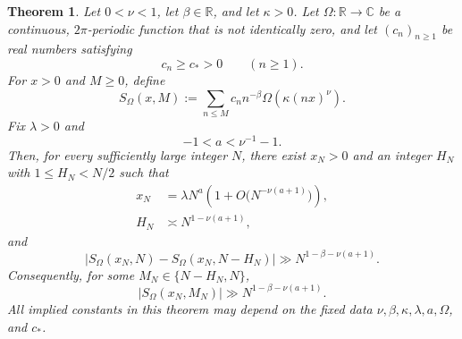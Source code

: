 \documentclass[11pt]{amsart}
\theoremstyle{plain}
\newtheorem{theorem}{Theorem}[section]
\theoremstyle{definition}
\theoremstyle{remark}
\newcommand{\C}{\mathbb C}
\newcommand{\R}{\mathbb R}
\numberwithin{equation}{section}
\begin{document}
\begin{theorem}\label{thm:sector}
Let $0<\nu<1$, let $\beta\in\R$, and let $\kappa>0$.  Let $\Omega:\R\to\C$ be a continuous, $2\pi$-periodic function that is not identically zero, and let $(c_n)_{n\ge1}$ be real numbers satisfying
\begin{equation}\label{eq:coeff-lower}
  c_n\ge c_*>0\qquad(n\ge1).
\end{equation}
For $x>0$ and $M\ge0$, define
\begin{equation}\label{eq:general-S}
  S_{\Omega}(x,M)
  :=\sum_{n\le M}c_n n^{-\beta}
  \Omega\!\left(\kappa(nx)^\nu\right).
\end{equation}
Fix $\lambda>0$ and
\begin{equation}\label{eq:a-general-range}
  -1<a<\nu^{-1}-1.
\end{equation}
Then, for every sufficiently large integer $N$, there exist $x_N>0$ and an integer $H_N$ with $1\le H_N<N/2$ such that
\begin{align}
  x_N
  &=\lambda N^a\left(1+O\bigl(N^{-\nu(a+1)}\bigr)\right),\label{eq:sector-x}\\
  H_N
  &\asymp N^{1-\nu(a+1)},\label{eq:sector-H}
\end{align}
and
\begin{equation}\label{eq:sector-block}
  \bigl|S_{\Omega}(x_N,N)-S_{\Omega}(x_N,N-H_N)\bigr|
  \gg N^{1-\beta-\nu(a+1)}.
\end{equation}
Consequently, for some $M_N\in\{N-H_N,N\}$,
\begin{equation}\label{eq:sector-max}
  |S_{\Omega}(x_N,M_N)|
  \gg N^{1-\beta-\nu(a+1)}.
\end{equation}
All implied constants in this theorem may depend on the fixed data $\nu,\beta,\kappa,\lambda,a,\Omega$, and $c_*$.
\end{theorem}
\end{document}
